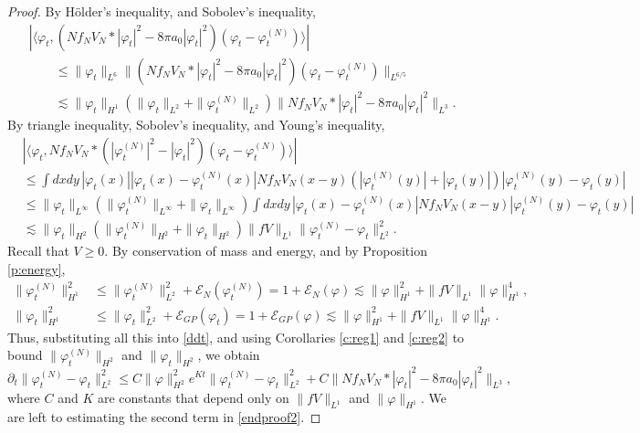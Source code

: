 \documentclass[11pt,a4paper]{scrartcl}
\begin{document}
\begin{proof}
  By H\"older's inequality, and Sobolev's inequality,
  \begin{align*}
    & |\langle \varphi_t, (N f_N V_N * |\varphi_t|^2 - 8 \pi a_0
    |\varphi_t|^2) (\varphi_t - \varphi_t^{(N)}) \rangle| \\
    & \qquad \le \| \varphi_t \|_{L^6} \| (N f_N V_N * |\varphi_t|^2 - 8 \pi
    a_0 |\varphi_t|^2) (\varphi_t - \varphi_t^{(N)}) \|_{L^{6/5}} \\
    & \qquad \apprle \| \varphi_t \|_{H^1} (\| \varphi_t \|_{L^2} + \|
    \varphi_t^{(N)} \|_{L^2}) \| N f_N V_N * |\varphi_t|^2 - 8 \pi a_0
    |\varphi_t|^2 \|_{L^3}.
  \end{align*}
  By triangle inequality, Sobolev's inequality, and Young's inequality,
  \begin{align*}
    & |\langle \varphi_t, N f_N V_N * (|\varphi_t^{(N)}|^2 - |\varphi_t|^2)
    (\varphi_t - \varphi_t^{(N)}) \rangle| \\
    & \le \int dx dy \, |\varphi_t(x)| |\varphi_t(x) - \varphi_t^{(N)}(x)| N
    f_N V_N(x-y) (|\varphi_t^{(N)}(y)| + |\varphi_t(y)|) |\varphi_t^{(N)}(y) -
    \varphi_t(y)| \\
    & \le \| \varphi_t \|_{L^\infty} ( \| \varphi_t^{(N)} \|_{L^\infty} + \|
    \varphi_t \|_{L^\infty} ) \int dx dy \, |\varphi_t(x) -
    \varphi_t^{(N)}(x)| N f_N V_N(x-y) |\varphi_t^{(N)}(y) - \varphi_t(y)| \\
    & \apprle \| \varphi_t \|_{H^2} ( \| \varphi_t^{(N)} \|_{H^2} + \|
    \varphi_t \|_{H^2} ) \| fV \|_{L^1} \| \varphi_t^{(N)} - \varphi_t
    \|_{L^2}^2.
  \end{align*}
  Recall that $V \ge 0$. By conservation of mass and energy, and by
  Proposition \ref{p:energy},
  \begin{align*}
    \| \varphi_t^{(N)} \|_{H^1}^2 & \le \| \varphi_t^{(N)} \|_{L^2}^2 +
    \mathcal{E}_N(\varphi_t^{(N)}) = 1 + \mathcal{E}_N(\varphi) \apprle \|
    \varphi \|_{H^1}^2 + \| fV \|_{L^1} \| \varphi \|_{H^1}^4, \\
    \| \varphi_t \|_{H^1}^2 & \le \| \varphi_t \|_{L^2}^2 +
    \mathcal{E}_{GP}(\varphi_t) = 1 + \mathcal{E}_{GP}(\varphi) \apprle \|
    \varphi \|_{H^1}^2 + \| fV \|_{L^1} \| \varphi \|_{H^1}^4.
  \end{align*}
  Thus, substituting all this into \eqref{ddt}, and using Corollaries
  \ref{c:reg1} and \ref{c:reg2} to bound $\| \varphi_t^{(N)} \|_{H^2}$ and $\|
  \varphi_t \|_{H^2}$, we obtain
  \begin{equation}
    \label{endproof2}
    \partial_t \| \varphi_t^{(N)} - \varphi_t \|_{L^2}^2 \le C \| \varphi
    \|_{H^2}^2 e^{Kt} \| \varphi_t^{(N)} - \varphi_t \|_{L^2}^2 + C \| N f_N
    V_N * |\varphi_t|^2 - 8 \pi a_0 |\varphi_t|^2 \|_{L^3},
  \end{equation}
  where $C$ and $K$ are constants that depend only on $\| fV \|_{L^1}$ and $\|
  \varphi \|_{H^1}$. We are left to estimating the second term in
  \eqref{endproof2}.



\end{proof}
\end{document}

